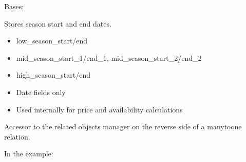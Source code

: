 \documentclass[letterpaper,10pt,english]{sphinxmanual}
\begin{document}

\begin{fulllineitems}
\label{\detokenize{index:bookings.models.SeasonInfo}}
\pysigstartsignatures
\pysiglinewithargsret
{}
{\sphinxparamcomma {}}
{}
\pysigstopsignatures
\sphinxAtStartPar
Bases: 

\sphinxAtStartPar
Stores season start and end dates.
\begin{description}
\begin{itemize}
\item {} 
\sphinxAtStartPar
low\_season\_start/end

\item {} 
\sphinxAtStartPar
mid\_season\_start\_1/end\_1, mid\_season\_start\_2/end\_2

\item {} 
\sphinxAtStartPar
high\_season\_start/end

\end{itemize}

\begin{itemize}
\item {} 
\sphinxAtStartPar
Date fields only

\item {} 
\sphinxAtStartPar
Used internally for price and availability calculations

\end{itemize}

\end{description}

\begin{fulllineitems}
\label{\detokenize{index:bookings.models.SeasonInfo.translations}}
\pysigstartsignatures
\pysigline
{}
\pysigstopsignatures
\sphinxAtStartPar
Accessor to the related objects manager on the reverse side of a
many\sphinxhyphen{}to\sphinxhyphen{}one relation.

\sphinxAtStartPar
In the example:


\end{fulllineitems}
\end{fulllineitems}
\end{document}
